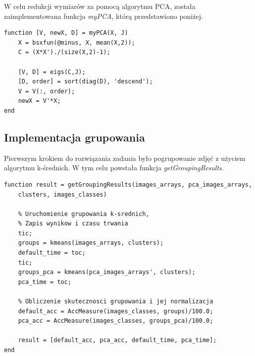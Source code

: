 \vspace{5mm}

W celu redukcji wymiarów za pomocą algorytmu PCA, została zaimplementowana funkcja \textit{myPCA}, którą przedstawiono poniżej.

\vspace{5mm}

\begin{lstlisting}[linewidth=16.0cm]
function [V, newX, D] = myPCA(X, J)
	X = bsxfun(@minus, X, mean(X,2));
	C = (X*X')./(size(X,2)-1);
	
	[V, D] = eigs(C,J);
	[D, order] = sort(diag(D), 'descend');
	V = V(:, order);
	newX = V'*X;
end
\end{lstlisting}


\subsection{Implementacja grupowania}

Pierwszym krokiem do rozwiązania zadania było pogrupowanie zdjęć z użyciem algorytmu k-średnich. W tym celu powstała funkcja \textit{getGroupingResults}. 

\vspace{5mm} 

\begin{lstlisting}[linewidth=16.0cm]
function result = getGroupingResults(images_arrays, pca_images_arrays, 
	clusters, images_classes)
	
	% Uruchomienie grupowania k-srednich,
	% Zapis wynikow i czasu trwania
	tic;
	groups = kmeans(images_arrays, clusters);
	default_time = toc;
	tic;
	groups_pca = kmeans(pca_images_arrays', clusters);
	pca_time = toc;
	
	% Obliczenie skutecznosci grupowania i jej normalizacja
	default_acc = AccMeasure(images_classes, groups)/100.0;
	pca_acc = AccMeasure(images_classes, groups_pca)/100.0;
	
	result = [default_acc, pca_acc, default_time, pca_time];
end
\end{lstlisting}

\vspace{5mm} 

